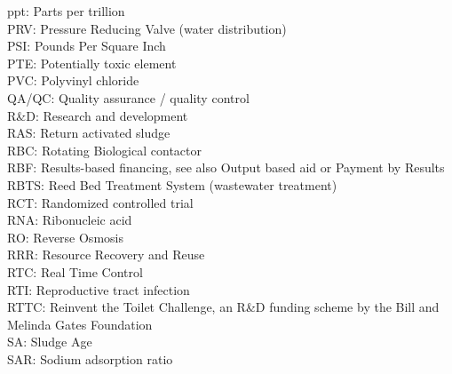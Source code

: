 ppt:  Parts per trillion
\vspace{0.3cm}\\
PRV:  Pressure Reducing Valve (water distribution)
\vspace{0.3cm}\\
PSI:  Pounds Per Square Inch
\vspace{0.3cm}\\
PTE:  Potentially toxic element
\vspace{0.3cm}\\
PVC:  Polyvinyl chloride
\vspace{0.3cm}\\
QA/QC:  Quality assurance / quality control
\vspace{0.3cm}\\
R\&D:  Research and development
\vspace{0.3cm}\\
RAS:  Return activated sludge
\vspace{0.3cm}\\
RBC: Rotating Biological contactor
\vspace{0.3cm}\\
RBF:  Results-based financing, see also Output based aid or Payment by Results
\vspace{0.3cm}\\
RBTS:  Reed Bed Treatment System (wastewater treatment)
\vspace{0.3cm}\\
RCT:  Randomized controlled trial
\vspace{0.3cm}\\
RNA:  Ribonucleic acid
\vspace{0.3cm}\\
RO:  Reverse Osmosis
\vspace{0.3cm}\\
RRR:  Resource Recovery and Reuse
\vspace{0.3cm}\\
RTC:  Real Time Control
\vspace{0.3cm}\\
RTI:  Reproductive tract infection
\vspace{0.3cm}\\
RTTC:  Reinvent the Toilet Challenge, an R\&D funding scheme by the Bill and Melinda Gates Foundation
\vspace{0.3cm}\\
SA:  Sludge Age
\vspace{0.3cm}\\
SAR:  Sodium adsorption ratio
